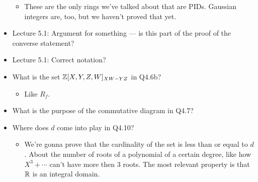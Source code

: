 \documentclass[../notes.tex]{subfiles}
\begin{document}
\begin{itemize}
\begin{itemize}
        \item These are the only rings we've talked about that are PIDs. Gaussian integers are, too, but we haven't proved that yet.
    \end{itemize}
    \item Lecture 5.1: Argument for something --- is this part of the proof of the converse statement?
    \item Lecture 5.1: Correct notation?
    \item What is the set $\mathbb{Z}[X,Y,Z,W]_{XW-YZ}$ in Q4.6b?
    \begin{itemize}
        \item Like $R_f$.
    \end{itemize}
    \item What is the purpose of the commutative diagram in Q4.7?
    \item Where does $d$ come into play in Q4.10?
    \begin{itemize}
        \item We're gonna prove that the cardinality of the set is less than or equal to $d$. About the number of roots of a polynomial of a certain degree, like how $X^3+\cdots$ can't have more then 3 roots. The most relevant property is that $\mathbb{R}$ is an integral domain.
    \end{itemize}
\end{itemize}
\end{document}
